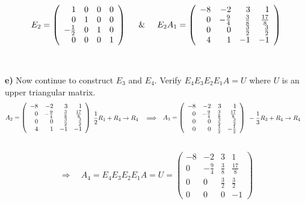 \documentclass{article}
\begin{document}
\[
E_2 = 
\left(
\begin{array}{rrrr}
1 & 0 & 0 & 0 \\
0 & 1 & 0 & 0 \\
-\frac{1}{2} & 0 & 1 & 0 \\
0 & 0 & 0 & 1 
\end{array}
\right)
\hspace{0.5cm} \& \hspace{0.5cm}
E_2A_1 =
\left(
\begin{array}{rrrr}
-8 & -2 & 3 & 1 \\
0 & -\frac{9}{4} & \frac{3}{8} & \frac{17}{8} \\
0 & 0 & \frac{3}{2} & \frac{3}{2} \\
4 & 1 & -1 & -1 
\end{array}
\right)
\]\\\\

{\bf e)} Now continue to construct $E_3$ and $ E_4$. Verify $E_4E_3E_2E_1A = U$
where $U$ is an upper triangular matrix. \\

\[
A_2 =
\left(
\begin{array}{rrrr}
-8 & -2 & 3 & 1 \\
0 & -\frac{9}{4} & \frac{3}{8} & \frac{17}{8} \\
0 & 0 & \frac{3}{2} & \frac{3}{2} \\
4 & 1 & -1 & -1 
\end{array}
\right)
\hspace{0.1cm}
\begin{aligned}
& \frac{1}{2}R_1 + R_4 \rightarrow R_4 \quad\Longrightarrow
\end{aligned}
A_3 =
\left(
\begin{array}{rrrr}
-8 & -2 & 3 & 1 \\
0 & -\frac{9}{4} & \frac{3}{8} & \frac{17}{8} \\
0 & 0 & \frac{3}{2} & \frac{3}{2} \\
0 & 0 & \frac{1}{2} & -\frac{1}{2}
\end{array}
\right)
\hspace{0.1cm}
\begin{aligned}
& -\frac{1}{3}R_3 + R_4 \rightarrow R_4
\end{aligned}
\]\\

\[
\begin{aligned}
\Longrightarrow \quad
A_4 = E_4E_3E_2E_1A = U =
\left(
\begin{array}{rrrr}
-8 & -2 & 3 & 1 \\
0 & -\frac{9}{4} & \frac{3}{8} & \frac{17}{8} \\
0 & 0 & \frac{3}{2} & \frac{3}{2} \\
0 & 0 & 0 & -1
\end{array}
\right)
\end{aligned}
\]
\end{document}
